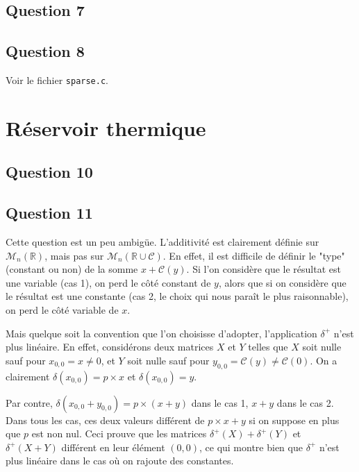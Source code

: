 \documentclass{article}
\begin{document}

\subsection*{Question 7}

\subsection*{Question 8}

Voir le fichier \texttt{sparse.c}.

\section{Réservoir thermique}

\subsection*{Question 10}

\subsection*{Question 11}

Cette question est un peu ambigüe. L'additivité est clairement définie sur $\mathcal{M}_n(\mathbb{R})$, mais pas sur $\mathcal{M}_n(\mathbb{R} \cup \mathcal{C})$. En effet, il est difficile de définir le "type" (constant ou non) de la somme $x + \mathcal{C}(y)$. Si l'on considère que le résultat est une variable (cas 1), on perd le côté constant de $y$, alors que si on considère que le résultat est une constante (cas 2, le choix qui nous paraît le plus raisonnable), on perd le côté variable de $x$.

Mais quelque soit la convention que l'on choisisse d'adopter, l'application $\delta^+$ n'est plus linéaire. En effet, considérons deux matrices $X$ et $Y$ telles que $X$ soit nulle sauf pour $x_{0,0} = x \neq 0$, et $Y$ soit nulle sauf pour $y_{0,0} = \mathcal{C}(y) \neq \mathcal{C}(0)$.
On a clairement $\delta(x_{0,0}) = p \times x$ et $\delta(x_{0,0}) = y$.

Par contre, $\delta(x_{0,0} + y_{0,0}) = p \times (x+y)$ dans le cas 1, $x+y$ dans le cas 2. Dans tous les cas, ces deux valeurs différent de $p \times x + y$ si on suppose en plus que $p$ est non nul. Ceci prouve que les matrices $\delta^+(X) + \delta^+(Y)$ et $\delta^+(X+Y)$ différent en leur élément $(0,0)$, ce qui montre bien que $\delta^+$ n'est plus linéaire dans le cas où on rajoute des constantes.
\end{document}
